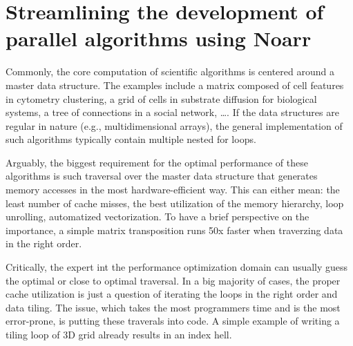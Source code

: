 \chapter{Streamlining the development of parallel algorithms using Noarr}





Commonly, the core computation of scientific algorithms is centered around a master data structure. The examples include a matrix composed of cell features in cytometry clustering, a grid of cells in substrate diffusion for biological systems, a tree of connections in a social network, \dots. If the data structures are regular in nature (e.g., multidimensional arrays), the general implementation of such algorithms typically contain multiple nested for loops. 

Arguably, the biggest requirement for the optimal performance of these algorithms is such traversal over the master data structure that generates memory accesses in the most hardware-efficient way. This can either mean: the least number of cache misses, the best utilization of the memory hierarchy, loop unrolling, automatized vectorization. To have a brief perspective on the importance, a simple matrix transposition runs 50x faster when traverzing data in the right order.  

Critically, the expert int the performance optimization domain can usually guess the optimal or close to optimal traversal. In a big majority of cases, the proper cache utilization is just a question of iterating the loops in the right order and data tiling. The issue, which takes the most programmers time and is the most error-prone, is putting these traverals into code. A simple example of writing a tiling loop of 3D grid already results in an index hell.

